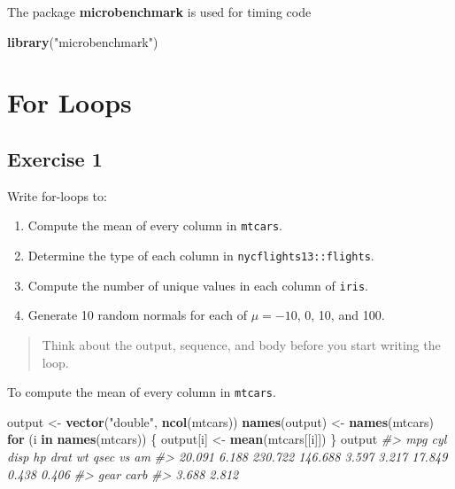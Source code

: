 \documentclass[]{book}
\newenvironment{Shaded}{\begin{snugshade}}{\end{snugshade}}
\newcommand{\CommentTok}[1]{\textcolor[rgb]{0.56,0.35,0.01}{\textit{#1}}}
\newcommand{\ControlFlowTok}[1]{\textcolor[rgb]{0.13,0.29,0.53}{\textbf{#1}}}
\newcommand{\KeywordTok}[1]{\textcolor[rgb]{0.13,0.29,0.53}{\textbf{#1}}}
\newcommand{\NormalTok}[1]{#1}
\newcommand{\StringTok}[1]{\textcolor[rgb]{0.31,0.60,0.02}{#1}}
\providecommand{\tightlist}{%
  \setlength{\itemsep}{0pt}\setlength{\parskip}{0pt}}
\theoremstyle{plain}
\theoremstyle{remark}
\theoremstyle{definition}
\theoremstyle{definition}
\theoremstyle{definition}
\theoremstyle{remark}
\begin{document}
The package \textbf{microbenchmark} is used for timing code

\begin{Shaded}
\begin{Highlighting}[]
\KeywordTok{library}\NormalTok{(}\StringTok{"microbenchmark"}\NormalTok{)}
\end{Highlighting}
\end{Shaded}

\hypertarget{for-loops}{%
\section{For Loops}\label{for-loops}}

\hypertarget{exercise-1-57}{%
\subsection{Exercise 1}\label{exercise-1-57}}

Write for-loops to:

\begin{enumerate}
\def\labelenumi{\arabic{enumi}.}
\tightlist
\item
  Compute the mean of every column in \texttt{mtcars}.
\item
  Determine the type of each column in \texttt{nycflights13::flights}.
\item
  Compute the number of unique values in each column of \texttt{iris}.
\item
  Generate 10 random normals for each of \(\mu = -10\), 0, 10, and 100.
\end{enumerate}

\begin{quote}
Think about the output, sequence, and body before you start writing the
loop.
\end{quote}

To compute the mean of every column in \texttt{mtcars}.

\begin{Shaded}
\begin{Highlighting}[]
\NormalTok{output <-}\StringTok{ }\KeywordTok{vector}\NormalTok{(}\StringTok{"double"}\NormalTok{, }\KeywordTok{ncol}\NormalTok{(mtcars))}
\KeywordTok{names}\NormalTok{(output) <-}\StringTok{ }\KeywordTok{names}\NormalTok{(mtcars)}
\ControlFlowTok{for}\NormalTok{ (i }\ControlFlowTok{in} \KeywordTok{names}\NormalTok{(mtcars)) \{}
\NormalTok{  output[i] <-}\StringTok{ }\KeywordTok{mean}\NormalTok{(mtcars[[i]])}
\NormalTok{\}}
\NormalTok{output}
\CommentTok{#>     mpg     cyl    disp      hp    drat      wt    qsec      vs      am }
\CommentTok{#>  20.091   6.188 230.722 146.688   3.597   3.217  17.849   0.438   0.406 }
\CommentTok{#>    gear    carb }
\CommentTok{#>   3.688   2.812}
\end{Highlighting}
\end{Shaded}
\end{document}
